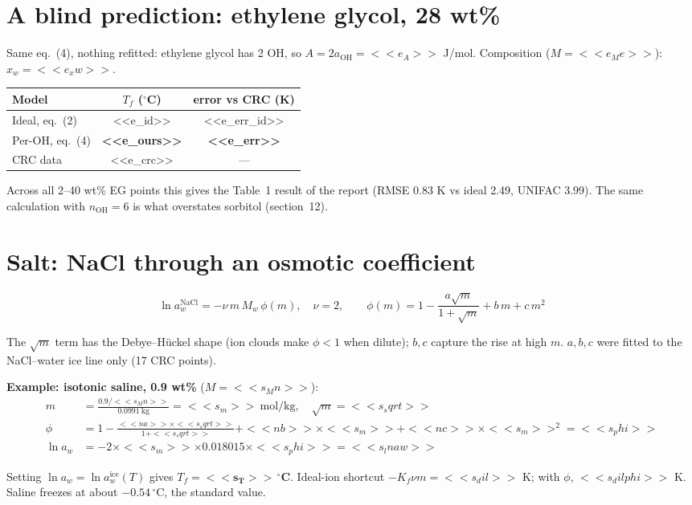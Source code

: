 \documentclass[11pt,a4paper]{article}
\newcommand{\aoh}{a_{\mathrm{OH}}}
\newcommand{\aice}{\ln a_w^{\mathrm{ice}}}
\begin{document}
\section{A blind prediction: ethylene glycol, 28 wt\%}
Same eq.~(4), nothing refitted: ethylene glycol has 2 OH, so $A=2\aoh=<<e_A>>$ J/mol. Composition ($M=<<e_Me>>$):
$x_w=<<e_xw>>$.
\begin{center}\small
\begin{tabular}{l c c}
\toprule
Model & $T_f$ ($^\circ$C) & error vs CRC (K)\\
\midrule
Ideal, eq.~(2) & <<e_id>> & <<e_err_id>>\\
Per-OH, eq.~(4) & \textbf{<<e_ours>>} & \textbf{<<e_err>>}\\
CRC data & <<e_crc>> & ---\\
\bottomrule
\end{tabular}
\end{center}
Across all 2--40 wt\% EG points this gives the Table~1 result of the report (RMSE 0.83 K vs ideal 2.49, UNIFAC 3.99).
The same calculation with $n_\mathrm{OH}=6$ is what overstates sorbitol (section~12).

\section{Salt: NaCl through an osmotic coefficient}
\begin{eqbox}
\[ \ln a_w^{\mathrm{NaCl}}=-\nu\, m\, M_w\,\phi(m),\quad \nu=2,\qquad
\phi(m)=1-\frac{a\sqrt m}{1+\sqrt m}+b\,m+c\,m^2 \tag{5}\]
\end{eqbox}
The $\sqrt m$ term has the Debye--H\"uckel shape (ion clouds make $\phi<1$ when dilute); $b,c$ capture the rise at high $m$.
$a,b,c$ were fitted to the NaCl--water ice line only (17 CRC points).

\textbf{Example: isotonic saline, 0.9 wt\%} ($M=<<s_Mn>>$):
\begin{align*}
m&=\frac{0.9/<<s_Mn>>}{0.0991\ \text{kg}}=<<s_m>>\ \text{mol/kg},\quad \sqrt m=<<s_sqrt>>\\
\phi&=1-\frac{<<na>>\times<<s_sqrt>>}{1+<<s_sqrt>>}+<<nb>>\times<<s_m>>+<<nc>>\times<<s_m>>^2=<<s_phi>>\\
\ln a_w&=-2\times<<s_m>>\times0.018015\times<<s_phi>>=<<s_lnaw>>
\end{align*}
\begin{result}
Setting $\ln a_w=\aice(T)$ gives $T_f=\mathbf{<<s_T>>\,^\circ}$\textbf{C}. Ideal-ion shortcut $-K_f\nu m=<<s_dil>>$ K;
with $\phi$, $<<s_dilphi>>$ K. Saline freezes at about $-0.54\,^\circ$C, the standard value.
\end{result}
\end{document}
